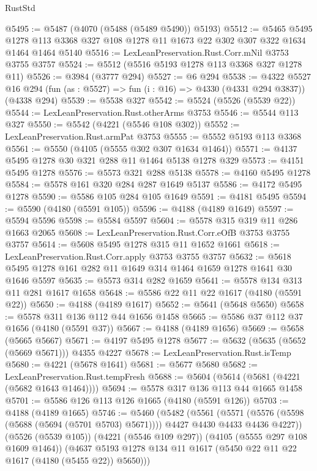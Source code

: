 \begin{lexlean}{RustStd}
\begin{coremodule}
{\begin{coremodule}
{{{{{{{{{{{{{{{{{{{{{{{{{{{{{{{@5495 := @5487 (@4070 (@5488 (@5489 @5490)) @5193)
@5512 := @5465
    @5495
    @1278
    @113
    @3368
    @327
    @108
    @1278
    @11
    @1673
    @22
    @302
    @307
    @322
    @1634
    @1464
    @1464
    @5140
@5516 := LexLeanPreservation.Rust.Corr.mNil @3753 @3755 @3757
@5524 := @5512 (@5516 @5193 @1278 @113 @3368 @327 @1278 @11)
@5526 := @3984 (@3777 @294)
@5527 := @6 @294
@5538 := @4322
    @5527
    @16
    @294
    (fun (as : @5527) => fun (i : @16) => @4330 (@4331 @294 @3837))
    (@4338 @294)
@5539 := @5538 @327
@5542 := @5524 (@5526 (@5539 @22))
@5544 := LexLeanPreservation.Rust.otherArms @3753
@5546 := @5544 @113 @327
@5550 := @5542 (@4221 (@5546 @108 @302))
@5552 := LexLeanPreservation.Rust.armPat @3753
@5555 := @5552 @5193 @113 @3368
@5561 := @5550 (@4105 (@5555 @302 @307 @1634 @1464))
@5571 := @4137 @5495 @1278 @30 @321 @288 @11 @1464 @5138 @1278 @329
@5573 := @4151 @5495 @1278
@5576 := @5573 @321 @288 @5138
@5578 := @4160 @5495 @1278
@5584 := @5578 @161 @320 @284 @287 @1649 @5137
@5586 := @4172 @5495 @1278
@5590 := @5586 @105 @284 @105 @1649
@5591 := @4181 @5495
@5594 := @5590 (@4180 (@5591 @105))
@5596 := @4188 (@4189 @1649)
@5597 := @5594 @5596
@5598 := @5584 @5597
@5604 := @5578 @315 @319 @11 @286 @1663 @2065
@5608 := LexLeanPreservation.Rust.Corr.eOfB @3753 @3755 @3757
@5614 := @5608 @5495 @1278 @315 @11 @1652 @1661
@5618 := LexLeanPreservation.Rust.Corr.apply @3753 @3755 @3757
@5632 := @5618 @5495 @1278 @161 @282 @11 @1649 @314 @1464 @1659 @1278 @1641 @30 @1646 @5597
@5635 := @5573 @314 @282 @1659
@5641 := @5578 @134 @313 @11 @281 @1617 @1658
@5648 := @5586 @22 @11 @22 @1617 (@4180 (@5591 @22))
@5650 := @4188 (@4189 @1617)
@5652 := @5641 (@5648 @5650)
@5658 := @5578 @311 @136 @112 @44 @1656 @1458
@5665 := @5586 @37 @112 @37 @1656 (@4180 (@5591 @37))
@5667 := @4188 (@4189 @1656)
@5669 := @5658 (@5665 @5667)
@5671 := @4197 @5495 @1278
@5677 := @5632 (@5635 (@5652 (@5669 @5671))) @4355 @4227
@5678 := LexLeanPreservation.Rust.isTemp
@5680 := @4221 (@5678 @1641)
@5681 := @5677 @5680
@5682 := LexLeanPreservation.Rust.tempFresh
@5688 := @5604 (@5614 (@5681 (@4221 (@5682 @1643 @1464))))
@5694 := @5578 @317 @136 @113 @44 @1665 @1458
@5701 := @5586 @126 @113 @126 @1665 (@4180 (@5591 @126))
@5703 := @4188 (@4189 @1665)
@5746 := @5460
    (@5482
      (@5561
        (@5571 (@5576 (@5598 (@5688 (@5694 (@5701 @5703) @5671)))) @4427 @4430 @4433 @4436 @4227))
      (@5526 (@5539 @105))
      (@4221 (@5546 @109 @297))
      (@4105 (@5555 @297 @108 @1609 @1464))
      (@4637 @5193 @1278 @134 @11 @1617 (@5450 @22 @11 @22 @1617 (@4180 (@5455 @22)) @5650)))
}}}}}}}}}}}}}}}}}}}}}}}}}}}}}}}
\end{coremodule}}
\end{coremodule}
\end{lexlean}
